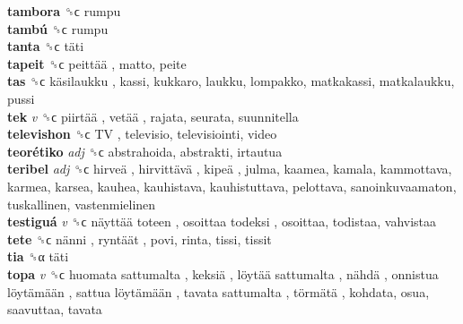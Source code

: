 \textbf{tambora} ␝ϲ  rumpu  \\
\textbf{tambú} ␝ϲ  rumpu  \\
\textbf{tanta} ␝ϲ   täti   \\
\textbf{tapeit} ␝ϲ   peittää , matto, peite  \\
\textbf{tas} ␝ϲ   käsilaukku , kassi, kukkaro, laukku, lompakko, matkakassi, matkalaukku, pussi  \\
\textbf{tek} \emph{v}  ␝ϲ   piirtää ,  vetää , rajata, seurata, suunnitella  \\
\textbf{televishon} ␝ϲ   TV , televisio, televisiointi, video  \\
\textbf{teorétiko} \emph{adj}  ␝ϲ  abstrahoida, abstrakti, irtautua  \\
\textbf{teribel} \emph{adj}  ␝ϲ   hirveä ,  hirvittävä ,  kipeä , julma, kaamea, kamala, kammottava, karmea, karsea, kauhea, kauhistava, kauhistuttava, pelottava, sanoinkuvaamaton, tuskallinen, vastenmielinen  \\
\textbf{testiguá} \emph{v}  ␝ϲ   näyttää toteen ,  osoittaa todeksi , osoittaa, todistaa, vahvistaa  \\
\textbf{tete} ␝ϲ   nänni ,  ryntäät , povi, rinta, tissi, tissit  \\
\textbf{tia} ␝α   täti   \\
\textbf{topa} \emph{v}  ␝ϲ   huomata sattumalta ,  keksiä ,  löytää sattumalta ,  nähdä ,  onnistua löytämään ,  sattua löytämään ,  tavata sattumalta ,  törmätä , kohdata, osua, saavuttaa, tavata  \\
